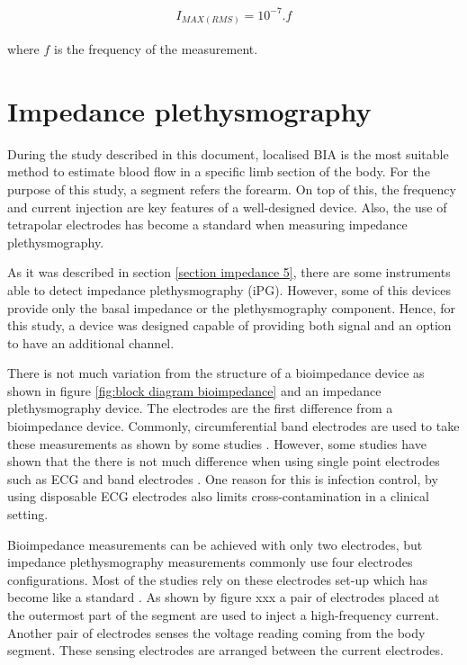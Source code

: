\begin{align}
	\label{eq:current body}
     I_{MAX(RMS)} = 10^{-7}.f
\end{align}

where $f$ is the frequency of the measurement.

\section{Impedance plethysmography} %
\label{section impedance 9}
During the study described in this document, localised BIA is the most suitable method to estimate blood flow in a specific limb section of the body. For the purpose of this study, a segment refers the forearm. On top of this, the frequency and current injection are key features of a well-designed device. Also, the use of tetrapolar electrodes has become a standard when measuring impedance plethysmography. 

As it was described in section \ref{section impedance 5}, there are some instruments able to detect impedance plethysmography (iPG). However, some of this devices provide only the basal impedance or the plethysmography component. Hence, for this study, a device was designed capable of providing both signal and an option to have an additional channel.

There is not much variation from the structure of a bioimpedance device as shown in figure \ref{fig:block diagram bioimpedance} and an impedance plethysmography device. The electrodes are the first difference from a bioimpedance device. Commonly, circumferential band electrodes are used to take these measurements as shown by some studies . However, some studies have shown that the there is not much difference when using single point electrodes such as ECG and band electrodes . One reason for this is infection control, by using disposable ECG electrodes also limits cross-contamination in a clinical setting.

Bioimpedance measurements can be achieved with only two electrodes, but impedance plethysmography measurements commonly use four electrodes configurations. Most of the studies rely on these electrodes set-up which has become like a standard . As shown by figure xxx a pair of electrodes placed at the outermost part of the segment are used to inject a high-frequency current. Another pair of electrodes senses the voltage reading coming from the body segment. These sensing electrodes are arranged between the current electrodes. 

